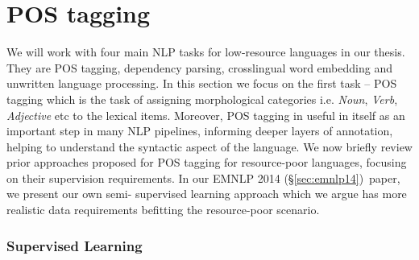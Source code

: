 \documentclass[12pt,twoside,final,hidelinks]{ltthesis}
\theoremstyle{definition}
\newcommand\emnlpiv{EMNLP 2014 (\S\ref{sec:emnlp14})}
\begin{document}


\section{POS tagging}
We will work with four main NLP tasks for low-resource languages in our thesis. They are POS tagging, dependency parsing, crosslingual word embedding and unwritten language processing. In this section we focus on the first task -- POS tagging which is the task of 
assigning morphological categories i.e. \textit{Noun}, \textit{Verb}, \textit{Adjective} etc to the lexical items. Moreover, POS tagging in useful in itself as an 
important step in many NLP pipelines, informing deeper layers of annotation, helping to understand the syntactic aspect of the language. We now briefly review prior 
approaches proposed for POS tagging for resource-poor languages, focusing on their supervision requirements. In our \emnlpiv\ paper, we present our own semi-
supervised learning approach which we argue has more realistic data requirements befitting the resource-poor scenario. 
\subsubsection{Supervised Learning}
\end{document}
